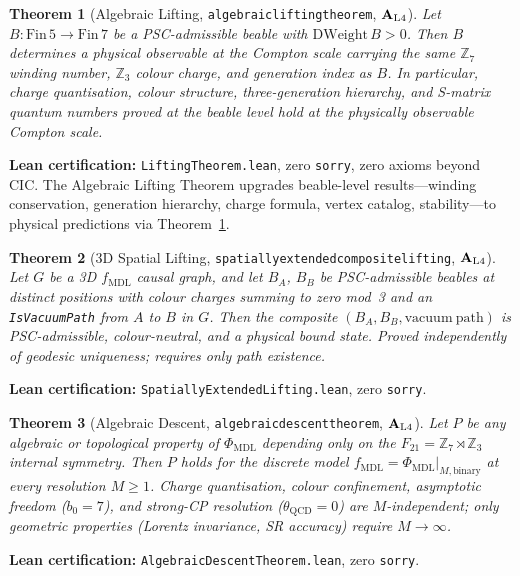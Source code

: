 \documentclass[12pt,letterpaper]{article}
\newtheorem{theorem}{Theorem}[section]
\newcommand{\fmdl}{f_{\mathrm{MDL}}}
\newcommand{\Zseven}{\mathbb{Z}_7}
\newcommand{\Zthree}{\mathbb{Z}_3}
\newcommand{\catAL}{\ensuremath{\textbf{A}_{\rm L4}}}
\newcommand{\lean}[1]{%
  \penalty-100
  \begingroup\def\_{\textunderscore\allowbreak}\texttt{#1}\endgroup}
\begin{document}
\begin{theorem}[Algebraic Lifting, \lean{algebraic\_lifting\_theorem}, \catAL]
\label{thm:algebraic-lifting}
Let $B : \mathrm{Fin}\,5 \to \mathrm{Fin}\,7$ be a PSC-admissible beable with
$\mathrm{DWeight}\,B > 0$.
Then $B$ determines a physical observable at the Compton scale carrying the same
$\Zseven$ winding number, $\Zthree$ colour charge, and generation index as $B$.
In particular, charge quantisation, colour structure, three-generation hierarchy,
and S-matrix quantum numbers proved at the beable level hold at the physically
observable Compton scale.
\end{theorem}

\noindent\textbf{Lean certification:} \lean{LiftingTheorem.lean}, zero \texttt{sorry}, zero axioms beyond CIC.
The Algebraic Lifting Theorem upgrades beable-level results---winding conservation,
generation hierarchy, charge formula, vertex catalog, stability---to
physical predictions via Theorem~\ref{thm:algebraic-lifting}.

\begin{theorem}[3D Spatial Lifting, \lean{spatially\_extended\_composite\_lifting},
\catAL]
\label{thm:spatial-lifting}
Let $G$ be a 3D $\fmdl$ causal graph, and let $B_A$, $B_B$ be PSC-admissible
beables at distinct positions with colour charges summing to zero mod~3 and an
\lean{IsVacuumPath} from $A$ to $B$ in $G$.
Then the composite $(B_A, B_B, \mathrm{vacuum\ path})$ is PSC-admissible,
colour-neutral, and a physical bound state.
Proved independently of geodesic uniqueness; requires only path existence.
\end{theorem}

\noindent\textbf{Lean certification:} \lean{SpatiallyExtendedLifting.lean},
zero \texttt{sorry}.

\begin{theorem}[Algebraic Descent, \lean{algebraic\_descent\_theorem}, \catAL]
\label{thm:algebraic-descent}
Let $P$ be any algebraic or topological property of $\Phi_{\mathrm{MDL}}$
depending only on the $F_{21} = \Zseven \rtimes \Zthree$ internal symmetry.
Then $P$ holds for the discrete model $\fmdl = \Phi_{\mathrm{MDL}}|_{M,\mathrm{binary}}$
at every resolution $M \geq 1$.
Charge quantisation, colour confinement, asymptotic freedom ($b_0 = 7$), and
strong-CP resolution ($\theta_{\mathrm{QCD}} = 0$) are $M$-independent;
only geometric properties (Lorentz invariance, SR accuracy) require $M \to \infty$.
\end{theorem}

\noindent\textbf{Lean certification:} \lean{AlgebraicDescentTheorem.lean},
zero \texttt{sorry}.
\end{document}
